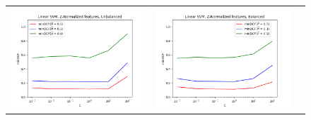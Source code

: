 \documentclass[12pt,a4paper]{article}
\begin{document}
\begin{figure}[H]
    \begin{center}
        \hspace*{-25pt}
        \begin{tabular}{ccc}
            \includegraphics[width = 200pt]{img/evaluation_plots/C-svm-z-normalized-unbalanced.png} &
            \includegraphics[width = 200pt]{img/evaluation_plots/C-svm-z-normalized-balanced.png}     \\
        \end{tabular}
    \end{center}
\end{figure}
\end{document}
